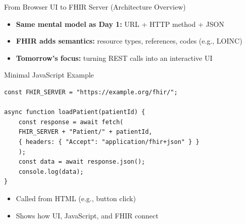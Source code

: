 \documentclass[aspectratio=1610]{beamer}
\begin{document}
\begin{frame}{From Browser UI to FHIR Server (Architecture Overview)}
\begin{center}
		\end{center}
		
		\vspace{0.2cm}
		\begin{itemize}
			\item \textbf{Same mental model as Day 1:} URL + HTTP method + JSON
			\item \textbf{FHIR adds semantics:} resource types, references, codes (e.g., LOINC)
			\item \textbf{Tomorrow's focus:} turning REST calls into an interactive UI
		\end{itemize}
		
	\end{frame}
	
	
	
\begin{frame}[fragile]{Minimal JavaScript Example}
	
	\lstset{
		language=JavaScript,
		basicstyle=\ttfamily\scriptsize,  %
		breaklines=true,                   %
		breakatwhitespace=true
	}
	
	\begin{lstlisting}
const FHIR_SERVER = "https://example.org/fhir/";
		
async function loadPatient(patientId) {
	const response = await fetch(
	FHIR_SERVER + "Patient/" + patientId,
	{ headers: { "Accept": "application/fhir+json" } }
	);
	const data = await response.json();
	console.log(data);
}
	\end{lstlisting}
	
	\begin{itemize}
		\item Called from HTML (e.g., button click)
		\item Shows how UI, JavaScript, and FHIR connect
	\end{itemize}
	
\end{frame}
	
\end{document}
